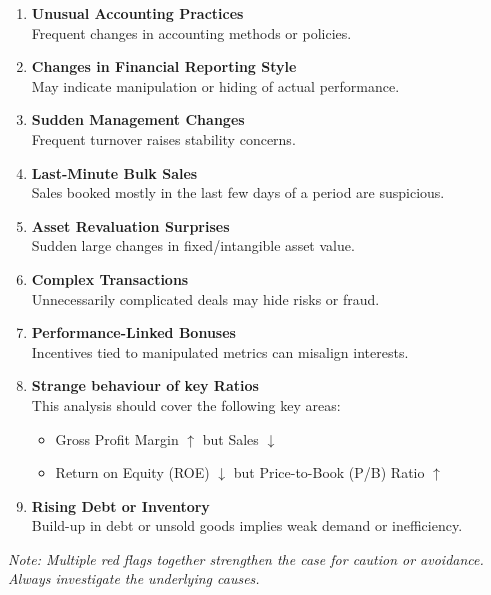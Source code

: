 \documentclass[12pt]{article}
\begin{document}
\begin{enumerate}
    \item \textbf{Unusual Accounting Practices} \\
    Frequent changes in accounting methods or policies.
    
    \item \textbf{Changes in Financial Reporting Style} \\
    May indicate manipulation or hiding of actual performance.
    
    \item \textbf{Sudden Management Changes} \\
    Frequent turnover raises stability concerns.
    
    \item \textbf{Last-Minute Bulk Sales} \\
    Sales booked mostly in the last few days of a period are suspicious.
    
    \item \textbf{Asset Revaluation Surprises} \\
    Sudden large changes in fixed/intangible asset value.
    
    \item \textbf{Complex Transactions} \\
    Unnecessarily complicated deals may hide risks or fraud.
    
    \item \textbf{Performance-Linked Bonuses} \\
    Incentives tied to manipulated metrics can misalign interests.
    
    \item \textbf{Strange behaviour of key Ratios} \\
    This analysis should cover the following key areas:
    \begin{itemize}
        \item Gross Profit Margin \(\uparrow\) but Sales \(\downarrow\)
        \item Return on Equity (ROE) \(\downarrow\) but Price-to-Book (P/B) Ratio \(\uparrow\)
    \end{itemize}
    
    \item \textbf{Rising Debt or Inventory} \\
    Build-up in debt or unsold goods implies weak demand or inefficiency.
\end{enumerate}

\textit{Note: Multiple red flags together strengthen the case for caution or avoidance. Always investigate the underlying causes.}
\end{document}
